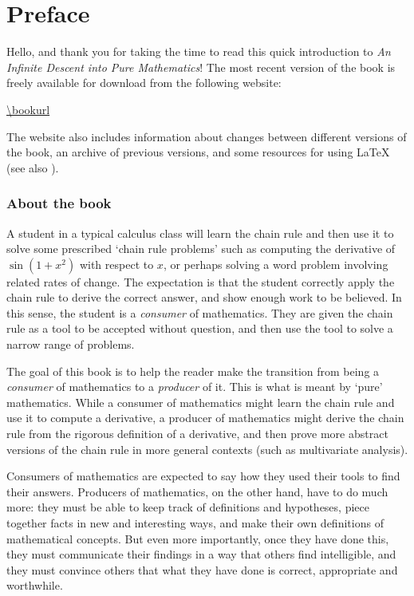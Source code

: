 \chapter*{Preface}

Hello, and thank you for taking the time to read this quick introduction to \textit{An Infinite Descent into Pure Mathematics}! The most recent version of the book is freely available for download from the following website:
\begin{center} \vspace{-10pt}
\url{\bookurl}
\end{center} \vspace{-10pt}
The website also includes information about changes between different versions of the book, an archive of previous versions, and some resources for using \LaTeX{} (see also ).

\subsection*{About the book}

A student in a typical calculus class will learn the chain rule and then use it to solve some prescribed `chain rule problems' such as computing the derivative of $\sin(1+x^2)$ with respect to $x$, or perhaps solving a word problem involving related rates of change. The expectation is that the student correctly apply the chain rule to derive the correct answer, and show enough work to be believed. In this sense, the student is a \textit{consumer} of mathematics. They are given the chain rule as a tool to be accepted without question, and then use the tool to solve a narrow range of problems.

The goal of this book is to help the reader make the transition from being a \textit{consumer} of mathematics to a \textit{producer} of it. This is what is meant by `pure' mathematics. While a consumer of mathematics might learn the chain rule and use it to compute a derivative, a producer of mathematics might derive the chain rule from the rigorous definition of a derivative, and then prove more abstract versions of the chain rule in more general contexts (such as multivariate analysis).

Consumers of mathematics are expected to say how they used their tools to find their answers. Producers of mathematics, on the other hand, have to do much more: they must be able to keep track of definitions and hypotheses, piece together facts in new and interesting ways, and make their own definitions of mathematical concepts. But even more importantly, once they have done this, they must communicate their findings in a way that others find intelligible, and they must convince others that what they have done is correct, appropriate and worthwhile.

